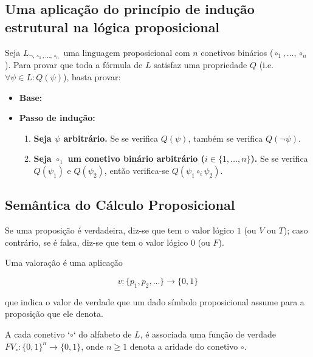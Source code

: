\subsection{Uma aplicação do princípio de indução estrutural na lógica proposicional}

Seja $L_{\neg,\circ_1,\ldots,\circ_n}$ uma linguagem proposicional com $n$ conetivos binários ($\circ_1,\ldots,\circ_n$). Para provar que toda a fórmula de $L$ satisfaz uma propriedade $Q$ (i.e. $\forall \psi \in L : Q(\psi)$), basta provar:

\begin{itemize}
    \item \textbf{Base:}
    \item \textbf{Passo de indução:}
    \begin{enumerate}[label=(\roman*)]
        \item \textbf{Seja $\psi$ arbitrário.} Se se verifica $Q(\psi)$, também se verifica $Q(\neg\psi)$.
        \item \textbf{Seja $\circ_1$ um conetivo binário arbitrário ($i \in \{1,\ldots,n\}$).} Se se verifica $Q(\psi_1)$ e $Q(\psi_2)$, então verifica-se $Q(\psi_1 \circ_i \psi_2)$.
    \end{enumerate}
\end{itemize}

\subsection{Semântica do Cálculo Proposicional}
Se uma proposição é verdadeira, diz-se que tem o valor lógico $1$ (ou $V$ ou $T$); caso contrário, se é falsa, diz-se que tem o valor lógico $0$ (ou $F$).

\begin{definition}
    Uma valoração é uma aplicação

    \[
        v:\{p_1,p_2,\ldots\}\to\{0,1\}
    \]

    que indica o valor de verdade que um dado símbolo proposicional assume para a proposição que ele denota.
\end{definition}

A cada conetivo `$\circ$` do alfabeto de $L$, é associada uma função de verdade $FV_{\circ}:\{0,1\}^n\to\{0,1\}$, onde $n \ge 1$ denota a aridade do conetivo $\circ$.

